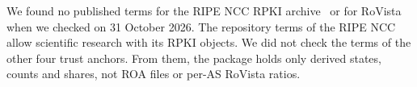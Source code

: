We found no published terms for the RIPE NCC RPKI archive~\cite{ripe_rpki_archive} or for RoVista~\cite{rovista_data} when we checked on 31 October 2026.
The repository terms of the RIPE NCC allow scientific research with its RPKI objects.
We did not check the terms of the other four trust anchors.
From them, the package holds only derived states, counts and shares, not ROA files or per-AS RoVista ratios.
